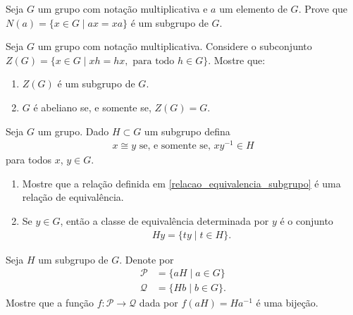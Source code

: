 \documentclass[12pt]{exam}
\begin{document}
    \vspace{.3cm}
    \questao{} Seja $G$ um grupo com nota\c{c}\~ao multiplicativa e $a$ um elemento de $G$. Prove que $N(a) = \{x \in G \mid ax = xa\}$ \'e um subgrupo de $G$.

    \vspace{.3cm}

    \questao{} Seja $G$ um grupo com nota\c{c}\~ao multiplicativa. Considere o subconjunto $Z(G) = \{x \in G \mid xh = hx, \mbox{ para todo } h \in G\}$. Mostre que:
    \begin{enumerate}[label=({\alph*})]
      \item $Z(G)$ \'e um subgrupo de $G$.

      \item $G$ \'e abeliano se, e somente se, $Z(G) = G$.
    \end{enumerate}

    \vspace{.3cm}

    \questao{} Seja $G$ um grupo. Dado $H \subset G$ um subgrupo defina
    \begin{align}\label{relacao_equivalencia_subgrupo}
        x \cong y \mbox{ se, e somente se, } xy^{-1} \in H
    \end{align}
    para todos $x$, $y \in G$.
    \begin{enumerate}[label={\alph*})]
        \item Mostre que a rela\c{c}\~ao definida em \eqref{relacao_equivalencia_subgrupo} \'e uma rela\c{c}\~ao de equival\^encia.

        \item Se $y \in G$, ent\~ao a classe de equival\^encia determinada por $y$ \'e o conjunto
        \begin{align*}\label{classe_equivalencia_subgrupo}
            Hy = \{ty \mid t \in H\}.
        \end{align*}
    \end{enumerate}

    \vspace{.3cm}

    \questao{} Seja $H$ um subgrupo de $G$. Denote por
    \begin{align*}
        \mathcal{P} &= \{aH \mid a \in G\}\\
        \mathcal{Q} &= \{Hb \mid b \in G\}.
    \end{align*}
    Mostre que a fun\c{c}\~ao $f : \mathcal{P} \to \mathcal{Q}$ dada por $f(aH) = Ha^{-1}$ \'e uma bije\c{c}\~ao.
\end{document}
